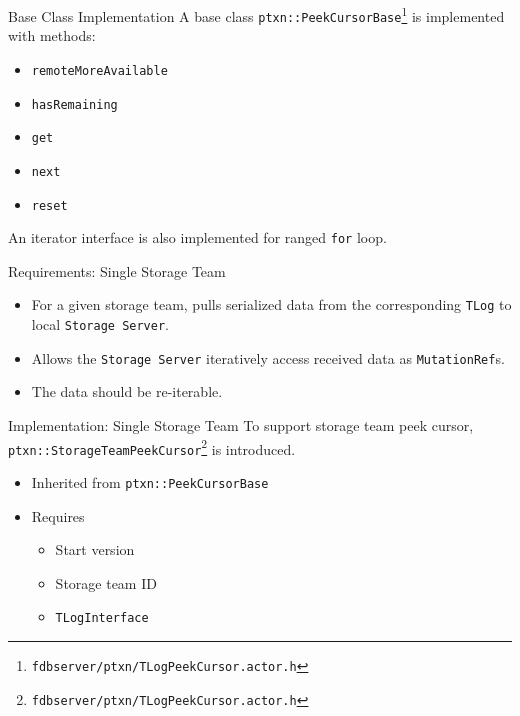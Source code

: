 \documentclass[9pt]{beamer}
\begin{document}
    \begin{frame}{Base Class Implementation}
        A base class \texttt{ptxn::PeekCursorBase}\footnote{\texttt{fdbserver/ptxn/TLogPeekCursor.actor.h}} is implemented with methods:
        \begin{itemize}
            \item \texttt{remoteMoreAvailable}
            \item \texttt{hasRemaining}
            \item \texttt{get}
            \item \texttt{next}
            \vspace{0.2em}
            \item {\color{gray}\texttt{reset}}
        \end{itemize}
        An iterator interface is also implemented for ranged \texttt{for} loop.
    \end{frame}
    
    
    \begin{frame}{Requirements: Single Storage Team}
        \begin{itemize}
            \item For a given storage team, pulls serialized data from the corresponding \texttt{TLog} to local \texttt{Storage Server}.
            \item Allows the \texttt{Storage Server} iteratively access received data as \texttt{MutationRef}s.
            \item {\color{gray}The data should be re-iterable.}
        \end{itemize}
    \end{frame}
    
    \begin{frame}{Implementation: Single Storage Team}
        To support storage team peek cursor, \texttt{ptxn::StorageTeamPeekCursor}\footnote{\texttt{fdbserver/ptxn/TLogPeekCursor.actor.h}} is introduced.
        \begin{itemize}
            \item Inherited from \texttt{ptxn::PeekCursorBase}
            \item Requires
            \begin{itemize}
                \item Start version
                \item Storage team ID
                \item \texttt{TLogInterface}
            \end{itemize}
        \end{itemize}
    \end{frame}
    
\end{document}

